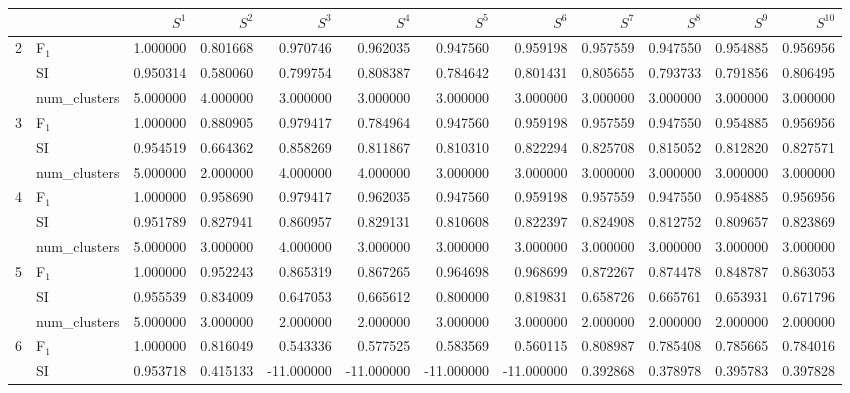 \begin{tabular}{llrrrrrrrrrr}
\toprule
 &  & $S^{1}$ & $S^{2}$ & $S^{3}$ & $S^{4}$ & $S^{5}$ & $S^{6}$ & $S^{7}$ & $S^{8}$ & $S^{9}$ & $S^{10}$ \\
\midrule
\multirow[c]{3}{*}{2} & F$_1$ & 1.000000 & 0.801668 & 0.970746 & 0.962035 & 0.947560 & 0.959198 & 0.957559 & 0.947550 & 0.954885 & 0.956956 \\
 & SI & 0.950314 & 0.580060 & 0.799754 & 0.808387 & 0.784642 & 0.801431 & 0.805655 & 0.793733 & 0.791856 & 0.806495 \\
 & num_clusters & 5.000000 & 4.000000 & 3.000000 & 3.000000 & 3.000000 & 3.000000 & 3.000000 & 3.000000 & 3.000000 & 3.000000 \\
\multirow[c]{3}{*}{3} & F$_1$ & 1.000000 & 0.880905 & 0.979417 & 0.784964 & 0.947560 & 0.959198 & 0.957559 & 0.947550 & 0.954885 & 0.956956 \\
 & SI & 0.954519 & 0.664362 & 0.858269 & 0.811867 & 0.810310 & 0.822294 & 0.825708 & 0.815052 & 0.812820 & 0.827571 \\
 & num_clusters & 5.000000 & 2.000000 & 4.000000 & 4.000000 & 3.000000 & 3.000000 & 3.000000 & 3.000000 & 3.000000 & 3.000000 \\
\multirow[c]{3}{*}{4} & F$_1$ & 1.000000 & 0.958690 & 0.979417 & 0.962035 & 0.947560 & 0.959198 & 0.957559 & 0.947550 & 0.954885 & 0.956956 \\
 & SI & 0.951789 & 0.827941 & 0.860957 & 0.829131 & 0.810608 & 0.822397 & 0.824908 & 0.812752 & 0.809657 & 0.823869 \\
 & num_clusters & 5.000000 & 3.000000 & 4.000000 & 3.000000 & 3.000000 & 3.000000 & 3.000000 & 3.000000 & 3.000000 & 3.000000 \\
\multirow[c]{3}{*}{5} & F$_1$ & 1.000000 & 0.952243 & 0.865319 & 0.867265 & 0.964698 & 0.968699 & 0.872267 & 0.874478 & 0.848787 & 0.863053 \\
 & SI & 0.955539 & 0.834009 & 0.647053 & 0.665612 & 0.800000 & 0.819831 & 0.658726 & 0.665761 & 0.653931 & 0.671796 \\
 & num_clusters & 5.000000 & 3.000000 & 2.000000 & 2.000000 & 3.000000 & 3.000000 & 2.000000 & 2.000000 & 2.000000 & 2.000000 \\
\multirow[c]{3}{*}{6} & F$_1$ & 1.000000 & 0.816049 & 0.543336 & 0.577525 & 0.583569 & 0.560115 & 0.808987 & 0.785408 & 0.785665 & 0.784016 \\
 & SI & 0.953718 & 0.415133 & -11.000000 & -11.000000 & -11.000000 & -11.000000 & 0.392868 & 0.378978 & 0.395783 & 0.397828 \\

\end{tabular}
